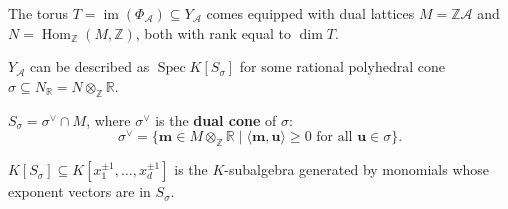 \documentclass[mathserif,handout]{beamer}
\newcommand{\vect}[1]{\mathbf#1}
\newcommand{\Z}{\mathbb Z}
\newcommand{\R}{\mathbb R}
\DeclareMathOperator{\Spec}{Spec}
\DeclareMathOperator{\Hom}{Hom}
\DeclareMathOperator{\im}{im}
\begin{document}
\begin{frame}
The torus $T=\im(\Phi_{\mathscr A})\subseteq Y_{\mathscr A}$ comes equipped with dual lattices $M=\Z\mathscr A$ and $N=\Hom_{\Z}(M,\Z)$, both with rank equal to $\dim T$.

\vspace{0.75pc}
$Y_{\mathscr A}$ can be described as $\Spec K[S_{\sigma}]$ for some rational polyhedral cone $\sigma\subseteq N_{\R}=N\otimes_{\Z}\R$.
    

\end{frame}

\begin{frame}
    $S_{\sigma}=\sigma^{\vee}\cap M$, where $\sigma^{\vee}$ is the \textbf{dual cone} of $\sigma$:
    \[
    \sigma^{\vee} = \{\vect m\in M\otimes_{\Z}\R\mid \langle \vect m,\vect u\rangle\geq 0 \text{ for all $\vect u\in\sigma$}\}.
    \]
    
    $K[S_{\sigma}]\subseteq K[x_1^{\pm 1},\dots,x_d^{\pm 1}]$ is the $K$-subalgebra generated by monomials whose exponent vectors are in $S_{\sigma}$.
\end{frame}
\end{document}
